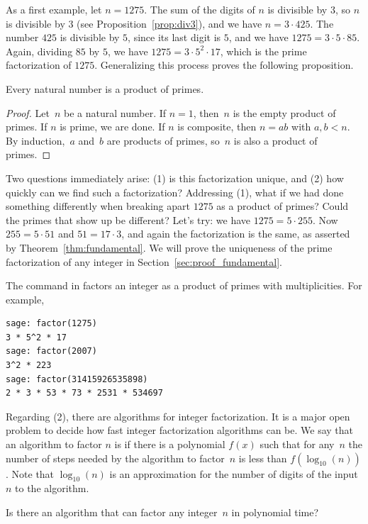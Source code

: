 As a first example, let $n=1275$.  The sum of the digits
of $n$ is divisible by $3$, so $n$ is divisible by $3$ (see
Proposition~\ref{prop:div3}), and we have $n=3\cdot 425$.
The number $425$ is divisible by $5$, since its last digit
is $5$, and we have $1275 = 3\cdot 5 \cdot 85$.  Again,
dividing $85$ by $5$, we have $1275 = 3\cdot 5^2 \cdot 17$,
which is the prime factorization of $1275$.
Generalizing this process proves the following proposition.
\begin{proposition}\label{prop:numbers_factor}
Every natural number is a product of primes.
\end{proposition}
\begin{proof}
Let~$n$ be a natural number.  If $n=1$, then~$n$ is the empty
product of primes.
If $n$ is prime, we are done.
If $n$ is composite, then $n=ab$ with $a,b<n$. By induction,~$a$
and~$b$ are products of primes, so~$n$ is also a product of primes.
\end{proof}

Two questions immediately arise: (1) is this factorization unique, and
(2) how quickly can we find such a factorization?  Addressing (1),
what if we had done something differently when breaking apart $1275$
as a product of primes?  Could the primes that show up be different?
Let's try: we have $1275 = 5\cdot 255$.  Now $255=5\cdot 51$ and
$51=17\cdot 3$, and again the factorization is the same, as asserted
by Theorem~\ref{thm:fundamental}.  We will prove the uniqueness
of the prime factorization of
any integer in Section~\ref{sec:proof_fundamental}.

\begin{sg}
The  command in \sage factors an integer
as a product of primes with multiplicities.   For example,
\begin{verbatim}
sage: factor(1275)
3 * 5^2 * 17
sage: factor(2007)
3^2 * 223
sage: factor(31415926535898)
2 * 3 * 53 * 73 * 2531 * 534697
\end{verbatim}
\end{sg}

Regarding (2), there are algorithms for integer factorization.
It is a major open problem to decide
how fast integer factorization algorithms can be.
We say that an algorithm to factor $n$ is 
if there is a
polynomial $f(x)$ such that for any~$n$ the number of steps needed by
the algorithm to factor~$n$ is less than $f(\log_{10}(n))$.  Note
that $\log_{10}(n)$ is an approximation for the number of digits
of the input~$n$ to the algorithm.
\begin{openproblem}
Is there an algorithm that can factor any
integer~$n$ in polynomial time?
\end{openproblem}

